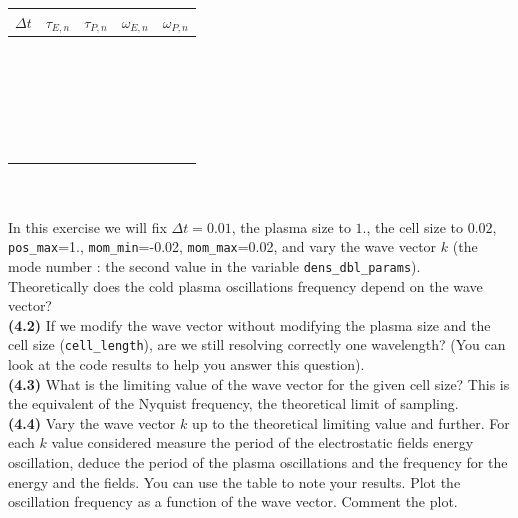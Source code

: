 \documentclass[11pt,a4paper]{article}
\begin{document}
\begin{tabularx}{\textwidth}{X|X|X|X|X}
\Large\textbf{$\Delta t$} & \Large\textbf{$\tau_{E,n}$} & \Large\textbf{$\tau_{P,n}$} &  \Large\textbf{$\omega_{E,n}$} & \Large\textbf{$\omega_{P,n}$} \\
\hline
 & & & & \\  & & & & \\ & & & & \\ & & & & \\  & & & & \\ & & & & \\  & & & & \\  & & & & \\ & & & & \\ & & & & \\  & & & & \\ & & & & \\
 & & & & \\  & & & & \\ & & & & \\ & & & & \\  & & & & \\ & & & & \\  & & & & \\  & & & & \\ & & & & \\ & & & & \\  & & & & \\ & & & & \\

\end{tabularx}


$ $\\
\\
In this exercise we will fix $\Delta t = 0.01$, the plasma size to $1.$, the cell size to $0.02$, \texttt{pos\_max}=1., \texttt{mom\_min}=-0.02, \mbox{\texttt{mom\_max}=0.02}, and vary the wave vector $k$ (the mode number : the second value in the variable \texttt{dens\_dbl\_params}). \\
  Theoretically does the cold plasma oscillations frequency depend on the wave vector? \\
{\bf (4.2)} If we modify the wave vector without modifying the plasma size and the cell size (\texttt{cell\_length}), are we still resolving correctly one wavelength? (You can look at the code results to help you answer this question). \\
{\bf (4.3)} What is the limiting value of the wave vector for the given cell size? This is the equivalent of the Nyquist frequency, the theoretical limit of sampling. \\
{\bf (4.4)} Vary the wave vector $k$ up to the theoretical limiting value  and further. For each $k$ value considered measure the period of the electrostatic fields energy oscillation, deduce the period of the plasma oscillations and the frequency for the energy and the fields. 
You can use the table to note your results. Plot the oscillation frequency as a function of the wave vector. Comment the plot. \\
\end{document}
